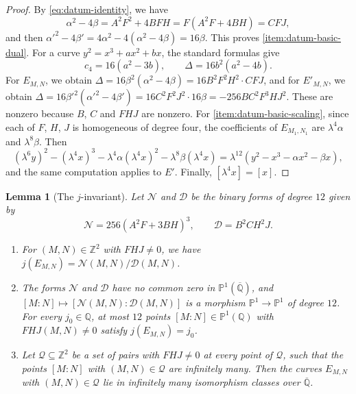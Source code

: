 \documentclass[12pt,oneside,openany]{book}
\theoremstyle{definition}
\theoremstyle{plain}
\numberwithin{equation}{chapter}
\theoremstyle{plain}
\newtheorem{lemma}[lemma]{Lemma}
\theoremstyle{definition}
\theoremstyle{remark}
\newcommand{\Q}{\mathbb Q}
\newcommand{\Z}{\mathbb Z}
\newcommand{\Qbar}{\overline{\mathbb Q}}
\newcommand{\sq}[1]{[#1]}
\begin{document}
\begin{proof}
By \eqref{eq:datum-identity}, we have
\begin{equation}
\alpha^2-4\beta=A^2F^2+4BFH=F(A^2F+4BH)=CFJ,
\end{equation}
and then $\alpha'^2-4\beta'=4\alpha^2-4(\alpha^2-4\beta)=16\beta$. This proves \ref{item:datum-basic-dual}. For a curve $y^2=x^3+ax^2+bx$, the standard formulas \cite[Section~III.1]{SilvermanAEC} give
\begin{equation}\label{eq:c4-Delta}
c_4=16(a^2-3b),\qquad\Delta=16b^2(a^2-4b).
\end{equation}
For $E_{M,N}$, we obtain $\Delta=16\beta^2(\alpha^2-4\beta)=16B^2F^2H^2\cdot CFJ$, and for $E'_{M,N}$, we obtain $\Delta=16\beta'^2(\alpha'^2-4\beta')=16C^2F^2J^2\cdot16\beta=-256BC^2F^3HJ^2$. These are nonzero because $B$, $C$ and $FHJ$ are nonzero. For \ref{item:datum-basic-scaling}, since each of $F$, $H$, $J$ is homogeneous of degree four, the coefficients of $E_{M_1,N_1}$ are $\lambda^4\alpha$ and $\lambda^8\beta$. Then
\begin{equation}
(\lambda^6y)^2-(\lambda^4x)^3-\lambda^4\alpha(\lambda^4x)^2-\lambda^8\beta(\lambda^4x)=\lambda^{12}(y^2-x^3-\alpha x^2-\beta x),
\end{equation}
and the same computation applies to $E'$. Finally, $\sq{\lambda^4x}=\sq x$.
\end{proof}

\begin{lemma}[The $j$-invariant]\label{lem:j-invariant}
Let $\mathcal N$ and $\mathcal D$ be the binary forms of degree $12$ given by
\begin{equation}\label{eq:j-forms}
\mathcal N=256(A^2F+3BH)^3,\qquad\mathcal D=B^2CH^2J.
\end{equation}
\begin{enumerate}[label=(\alph*),ref=(\alph*)]
\item\label{item:j-formula} For $(M,N)\in\Z^2$ with $FHJ\ne0$, we have $j(E_{M,N})=\mathcal N(M,N)/\mathcal D(M,N)$.
\item\label{item:j-degree} The forms $\mathcal N$ and $\mathcal D$ have no common zero in $\mathbb P^1(\Qbar)$, and $[M:N]\mapsto[\mathcal N(M,N):\mathcal D(M,N)]$ is a morphism $\mathbb P^1\to\mathbb P^1$ of degree $12$. For every $j_0\in\Q$, at most $12$ points $[M:N]\in\mathbb P^1(\Q)$ with $FHJ(M,N)\ne0$ satisfy $j(E_{M,N})=j_0$.
\item\label{item:j-infinite} Let $\mathcal Q\subseteq\Z^2$ be a set of pairs with $FHJ\ne0$ at every point of $\mathcal Q$, such that the points $[M:N]$ with $(M,N)\in\mathcal Q$ are infinitely many. Then the curves $E_{M,N}$ with $(M,N)\in\mathcal Q$ lie in infinitely many isomorphism classes over $\Qbar$.
\end{enumerate}
\end{lemma}
\end{document}
